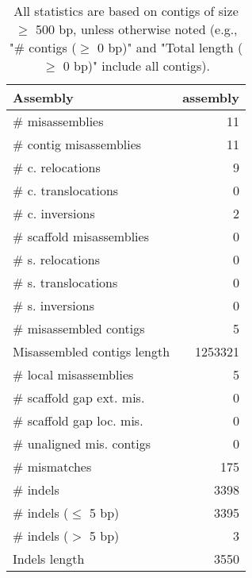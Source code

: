 \documentclass[12pt,a4paper]{article}
\begin{document}
\begin{table}[ht]
\begin{center}
\caption{All statistics are based on contigs of size $\geq$ 500 bp, unless otherwise noted (e.g., "\# contigs ($\geq$ 0 bp)" and "Total length ($\geq$ 0 bp)" include all contigs).}
\begin{tabular}{|l*{1}{|r}|}
\hline
Assembly & assembly \\ \hline
\# misassemblies & 11 \\ \hline
\hspace{2mm}\# contig misassemblies & 11 \\ \hline
\hspace{5mm}\# c. relocations & 9 \\ \hline
\hspace{5mm}\# c. translocations & 0 \\ \hline
\hspace{5mm}\# c. inversions & 2 \\ \hline
\hspace{2mm}\# scaffold misassemblies & 0 \\ \hline
\hspace{5mm}\# s. relocations & 0 \\ \hline
\hspace{5mm}\# s. translocations & 0 \\ \hline
\hspace{5mm}\# s. inversions & 0 \\ \hline
\# misassembled contigs & 5 \\ \hline
Misassembled contigs length & 1253321 \\ \hline
\# local misassemblies & 5 \\ \hline
\# scaffold gap ext. mis. & 0 \\ \hline
\# scaffold gap loc. mis. & 0 \\ \hline
\# unaligned mis. contigs & 0 \\ \hline
\# mismatches & 175 \\ \hline
\# indels & 3398 \\ \hline
\hspace{5mm}\# indels ($\leq$ 5 bp) & 3395 \\ \hline
\hspace{5mm}\# indels ($>$ 5 bp) & 3 \\ \hline
Indels length & 3550 \\ \hline
\end{tabular}
\end{center}
\end{table}
\end{document}
